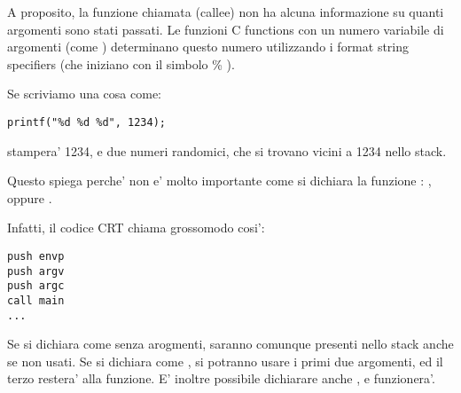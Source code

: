 \par
A proposito, la funzione chiamata (\gls{callee}) non ha alcuna informazione su quanti argomenti sono stati passati.
Le funzioni C functions con un numero variabile di argomenti (come \printf) determinano questo numero utilizzando i format string specifiers (che iniziano con il simbolo \% ).

Se scriviamo una cosa come:

\begin{lstlisting}
printf("%d %d %d", 1234);
\end{lstlisting}

\printf stampera' 1234, e due numeri randomici, che si trovano vicini a 1234 nello stack.

\par
Questo spiega perche' non e' molto importante come si dichiara la funzione \main : \main,  oppure .

Infatti, il codice \ac{CRT} chiama \main grossomodo cosi':

\begin{lstlisting}
push envp
push argv
push argc
call main
...
\end{lstlisting}

Se si dichiara \main come \main senza arogmenti, saranno comunque presenti nello stack anche se non usati.
Se si dichiara \main come ,
si potranno usare i primi due argomenti, ed il terzo restera'  alla funzione.
E' inoltre possibile dichiarare anche , e funzionera'.
